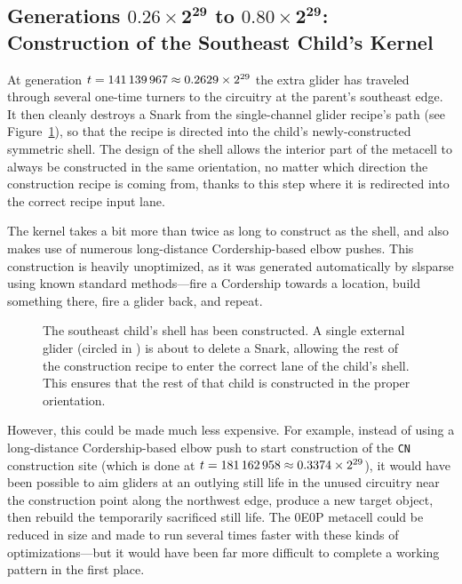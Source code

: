 \subsection{Generations $\mathbf{0.26 \times 2^{29}}$ to $\mathbf{0.80 \times 2^{29}}$: Construction of the Southeast Child's Kernel}\label{sec:0e0p_timeline_kernel}

At generation $t = 141{\,}139{\,}967 \approx 0.2629 \times 2^{29}$ the extra glider has traveled through several one-time turners to the circuitry at the parent's southeast edge. It then cleanly destroys a Snark from the single-channel glider recipe's path (see Figure~\ref{fig:0e0p_timeline_141139967}), so that the recipe is directed into the child's newly-constructed symmetric shell. The design of the shell allows the interior part of the metacell to always be constructed in the same orientation, no matter which direction the construction recipe is coming from, thanks to this step where it is redirected into the correct recipe input lane.

The kernel takes a bit more than twice as long to construct as the shell, and also makes use of numerous long-distance Cordership-based elbow pushes. This construction is heavily unoptimized, as it was generated automatically by slsparse using known standard methods---fire a Cordership towards a location, build something there, fire a glider back, and repeat.

\begin{figure}[!htb]
	\centering
	\caption{The southeast child's shell has been constructed. A single external glider (circled in ) is about to delete a Snark, allowing the rest of the construction recipe to enter the correct lane of the child's shell. This ensures that the rest of that child is constructed in the proper orientation.}
	\label{fig:0e0p_timeline_141139967}
\end{figure}

However, this could be made much less expensive. For example, instead of using a long-distance Cordership-based elbow push to start construction of the \texttt{CN} construction site (which is done at $t = 181{\,}162{\,}958 \approx 0.3374 \times 2^{29}$), it would have been possible to aim gliders at an outlying still life in the unused circuitry near the construction point along the northwest edge, produce a new target object, then rebuild the temporarily sacrificed still life. The 0E0P metacell could be reduced in size and made to run several times faster with these kinds of optimizations---but it would have been far more difficult to complete a working pattern in the first place.

